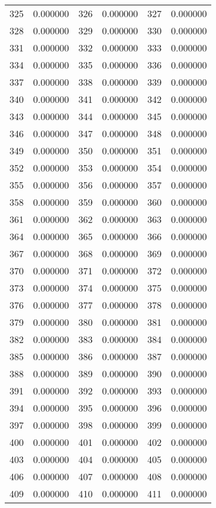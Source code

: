 \documentclass[12pt]{article}
\begin{document}
\begin{longtable}{@{}cc|cc|cc@{}}
325 & 0.000000 & 326 & 0.000000 & 327 & 0.000000 \\
328 & 0.000000 & 329 & 0.000000 & 330 & 0.000000 \\
331 & 0.000000 & 332 & 0.000000 & 333 & 0.000000 \\
334 & 0.000000 & 335 & 0.000000 & 336 & 0.000000 \\
337 & 0.000000 & 338 & 0.000000 & 339 & 0.000000 \\
340 & 0.000000 & 341 & 0.000000 & 342 & 0.000000 \\
343 & 0.000000 & 344 & 0.000000 & 345 & 0.000000 \\
346 & 0.000000 & 347 & 0.000000 & 348 & 0.000000 \\
349 & 0.000000 & 350 & 0.000000 & 351 & 0.000000 \\
352 & 0.000000 & 353 & 0.000000 & 354 & 0.000000 \\
355 & 0.000000 & 356 & 0.000000 & 357 & 0.000000 \\
358 & 0.000000 & 359 & 0.000000 & 360 & 0.000000 \\
361 & 0.000000 & 362 & 0.000000 & 363 & 0.000000 \\
364 & 0.000000 & 365 & 0.000000 & 366 & 0.000000 \\
367 & 0.000000 & 368 & 0.000000 & 369 & 0.000000 \\
370 & 0.000000 & 371 & 0.000000 & 372 & 0.000000 \\
373 & 0.000000 & 374 & 0.000000 & 375 & 0.000000 \\
376 & 0.000000 & 377 & 0.000000 & 378 & 0.000000 \\
379 & 0.000000 & 380 & 0.000000 & 381 & 0.000000 \\
382 & 0.000000 & 383 & 0.000000 & 384 & 0.000000 \\
385 & 0.000000 & 386 & 0.000000 & 387 & 0.000000 \\
388 & 0.000000 & 389 & 0.000000 & 390 & 0.000000 \\
391 & 0.000000 & 392 & 0.000000 & 393 & 0.000000 \\
394 & 0.000000 & 395 & 0.000000 & 396 & 0.000000 \\
397 & 0.000000 & 398 & 0.000000 & 399 & 0.000000 \\
400 & 0.000000 & 401 & 0.000000 & 402 & 0.000000 \\
403 & 0.000000 & 404 & 0.000000 & 405 & 0.000000 \\
406 & 0.000000 & 407 & 0.000000 & 408 & 0.000000 \\
409 & 0.000000 & 410 & 0.000000 & 411 & 0.000000 \\

\end{longtable}
\end{document}
